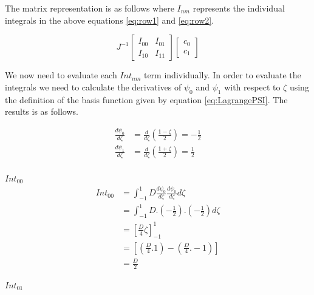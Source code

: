 \documentclass[11pt]{article}
\begin{document}
The matrix representation is as follows where $I_{nm}$ represents the individual integrals in the above equations \ref{eq:row1} and \ref{eq:row2}. 

\begin{equation}
J^{-1}
\begin{bmatrix}

I_{00} & I_{01} \\
I_{10} & I_{11}
\end{bmatrix}
\begin{bmatrix}

c_{0} \\  c_{1} 
\end{bmatrix}
\end{equation}

We now need to evaluate each $Int_{nm}$ term individually. In order to evaluate the integrals we need to calculate the derivatives of $\psi_0$ and $\psi_{1}$ with respect to $\zeta$ using the definition of the basis function given by equation \ref{eq:LagrangePSI}. The results is as follows.

\begin{subequations}
\label{eq:prematrix}
\begin{align}
\frac{d\psi_{0}}{d\zeta} &= \frac{d}{d\zeta}(\frac{1-\zeta}{2}) = -\frac{1}{2} \label{eq:psi0der}\\
\frac{d\psi_{1}}{d\zeta} &= \frac{d}{d\zeta}(\frac{1+\zeta}{2}) = \frac{1}{2} \label{eq:psi1der}
\end{align}
\end{subequations}
\\


\underline{$Int_{00}$} \\


\begin{equation}\label{eq:Int00}
\begin{split}
 Int_{00} &= \int_{-1}^{1} D \frac{d\psi_{0}}{d\zeta} \frac{d\psi_{0}}{d \zeta} d \zeta \\
&=  \int_{-1}^{1} D .( -\frac{1}{2}). (-\frac{1}{2}) d\zeta \\
& = \left[ \frac{D}{4} \zeta \right]_{-1}^{1} \\
& = \left[ (\frac{D}{4}.1) - (\frac{D}{4}.-1) \right] \\
& = \frac{D}{2}
\end{split}
\end{equation}

\underline{$Int_{01}$} \\
\end{document}
